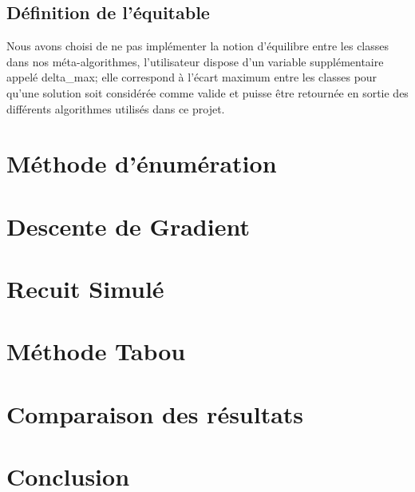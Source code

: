 \documentclass[a4paper]{article}
\begin{document}
\subsection{Définition de l'équitable}

Nous avons choisi de ne pas implémenter la notion  d'équilibre entre les classes dans nos méta-algorithmes, l'utilisateur dispose d'un variable supplémentaire appelé delta\_max; elle correspond à l'écart maximum entre les classes pour qu'une solution soit considérée comme valide et puisse être retournée en sortie des différents algorithmes utilisés dans ce projet.


\section{Méthode d’énumération}


\section{Descente de Gradient}

\section{Recuit Simulé}

\section{Méthode Tabou}

\section{Comparaison des résultats}

\section{Conclusion}
\end{document}
